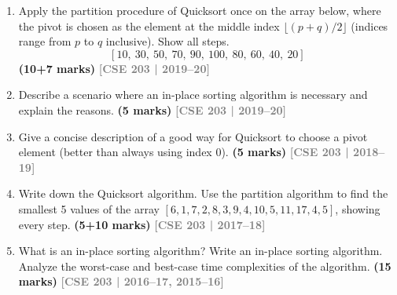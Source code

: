 \documentclass[12pt,a3paper]{article}
\newcommand{\yr}[1]{\hfill\textcolor{gray}{\small\textbf{[#1]}}}
\newcommand{\mk}[1]{\textcolor{orange!70!black}{\small\textbf{(#1 marks)}}}
\begin{document}
\begin{enumerate}
\begin{enumerate}[label=(\roman*)]
  \item Suppose, you have been asked to evaluate the performance of
  \textsc{Quick-Sort} algorithm. You are using a bad input array which results
  in a very unbalanced partition at each of the recursive steps. Consider that
  at each recursive call, the \textsc{Partition} function is producing an
  $\alpha$-to-$\beta$ proportional split. Now using a recursion tree, find the
  time complexity of the \textsc{Quick-Sort} algorithm for this scenario. If the
  last three digits of your student ID represents a number $x$, then consider
  the following:
  \begin{align*}
    \alpha &= x \quad \text{if } x \leq 100 \\
    \alpha &= 200 - x \quad \text{if } x > 100 \\
    \beta  &= 100 - \alpha
  \end{align*}
  Your answer must contain a well-drawn recursion tree where any kind of
  existing skewness of the tree is clearly illustrated.
\end{enumerate}
\mk{5+7=12}\yr{CSE 203 | 2020--21}

\item Apply the partition procedure of Quicksort once on the array below, where the pivot is chosen as the element at the middle index $\lfloor(p+q)/2\rfloor$ (indices range from $p$ to $q$ inclusive). Show all steps.
\[ [10,\ 30,\ 50,\ 70,\ 90,\ 100,\ 80,\ 60,\ 40,\ 20] \]
\mk{10+7}
\yr{CSE 203 | 2019--20}

\item Describe a scenario where an in-place sorting algorithm is necessary and explain the reasons. \mk{5}
\yr{CSE 203 | 2019--20}

\item Give a concise description of a good way for Quicksort to choose a pivot element (better than always using index 0). \mk{5}
\yr{CSE 203 | 2018--19}

\item Write down the Quicksort algorithm. Use the partition algorithm to find the smallest 5 values of the array $[6, 1, 7, 2, 8, 3, 9, 4, 10, 5, 11, 17, 4, 5]$, showing every step. \mk{5+10}
\yr{CSE 203 | 2017--18}

\item What is an in-place sorting algorithm? Write an in-place sorting algorithm. Analyze the worst-case and best-case time complexities of the algorithm. \mk{15}
\yr{CSE 203 | 2016--17, 2015--16}


\end{enumerate}
\end{document}
